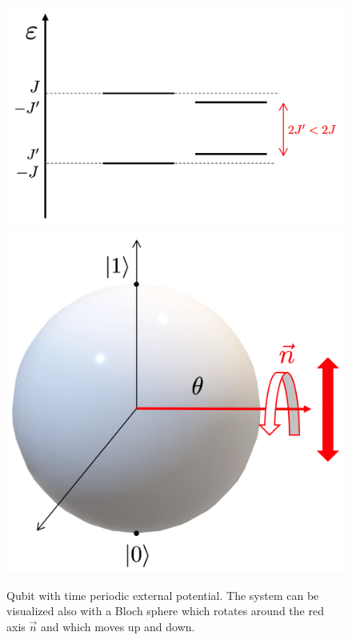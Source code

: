 \begin{figure}[H]
\centering
\includegraphics[width=0.58\linewidth]{images/Qubit_with_drive_1.png}
\includegraphics[width=0.37\linewidth]{images/Qubit_with_drive_2.png}
    \caption{Qubit with time periodic external potential. The system can be visualized also with a Bloch sphere which rotates around the red axis $\Vec{n}$ and which moves up and down.}
    \label{fig:quibit_drive}
\end{figure}

